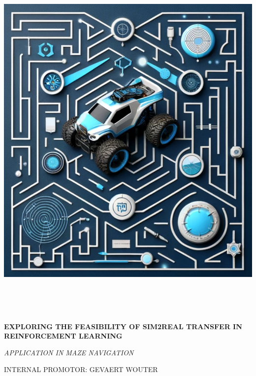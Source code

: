 \documentclass{article}
\begin{document}
\begin{titlepage}
    \begin{center}
        \includegraphics[width=18.5cm,height=18.5cm]{./cover_image.png}
    \end{center}
    \begin{adjustwidth}{1.5cm}{1.5cm}

    \vspace{0.5em}

    \MakeUppercase{\huge\textbf{Exploring the Feasibility of Sim2Real Transfer in Reinforcement Learning}}

    \MakeUppercase{\Large\textit{Application in Maze Navigation}}

    \vspace{1em}

    \MakeUppercase{Internal promotor: Gevaert Wouter}


\end{adjustwidth}
\end{titlepage}
\end{document}

